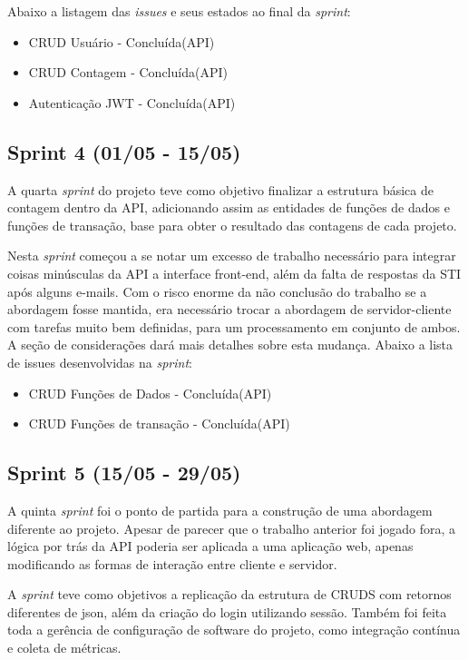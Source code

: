 Abaixo a listagem das \textit{issues} e seus estados ao final da \textit{sprint}:

\begin{itemize}
  \item CRUD Usuário - Concluída(API)
  \item CRUD Contagem - Concluída(API)
  \item Autenticação JWT - Concluída(API)
\end{itemize}

\subsection{Sprint 4 (01/05 - 15/05)}

A quarta \textit{sprint} do projeto teve como objetivo finalizar a estrutura básica de contagem dentro da API, adicionando assim as entidades de funções de dados e funções de transação, base para obter o resultado das contagens de cada projeto.

Nesta \textit{sprint} começou a se notar um excesso de trabalho necessário para integrar coisas minúsculas da API a interface front-end, além da falta de respostas da STI após alguns e-mails. Com o risco enorme da não conclusão do trabalho se a abordagem fosse mantida, era necessário trocar a abordagem de servidor-cliente com tarefas muito bem definidas, para um processamento em conjunto de ambos. A seção de considerações dará mais detalhes sobre esta mudança. Abaixo a lista de issues desenvolvidas na \textit{sprint}:

\begin{itemize}
  \item CRUD Funções de Dados - Concluída(API)
  \item CRUD Funções de transação - Concluída(API)
\end{itemize}

\subsection{Sprint 5 (15/05 - 29/05)}

A quinta \textit{sprint} foi o ponto de partida para a construção de uma abordagem diferente ao projeto. Apesar de parecer que o trabalho anterior foi jogado fora, a lógica por trás da API poderia ser aplicada a uma aplicação web, apenas modificando as formas de interação entre cliente e servidor.

A \textit{sprint} teve como objetivos a replicação da estrutura de CRUDS com retornos diferentes de json, além da criação do login utilizando sessão. Também foi feita toda a gerência de configuração de software do projeto, como integração contínua e coleta de métricas.

